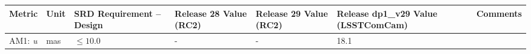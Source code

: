 \documentclass[DM,toc,lsstdraft]{lsstdoc}
\begin{document}
\begin{longtable}[]{@{}lllllll@{}}
  \toprule
  \begin{minipage}[b]{0.12\columnwidth}\raggedright\strut
  Metric\strut
  \end{minipage} & \begin{minipage}[b]{0.06\columnwidth}\raggedright\strut
  Unit\strut
  \end{minipage} & \begin{minipage}[b]{0.14\columnwidth}\raggedright\strut
  SRD Requirement -- Design\strut
  \end{minipage} & \begin{minipage}[b]{0.12\columnwidth}\raggedright\strut
  Release 28 Value (RC2) \strut
  \end{minipage} & \begin{minipage}[b]{0.12\columnwidth}\raggedright\strut
  Release 29 Value (RC2) \strut
  \end{minipage} & \begin{minipage}[b]{0.12\columnwidth}\raggedright\strut
  Release dp1\_v29 Value (LSSTComCam) \strut
  \end{minipage} & \begin{minipage}[b]{0.17\columnwidth}\raggedright\strut
  Comments\strut
  \end{minipage}\tabularnewline
  \midrule
  \endhead
  \begin{minipage}[t]{0.12\columnwidth}\raggedright\strut
  AM1: \emph{u}\strut
  \end{minipage} & \begin{minipage}[t]{0.06\columnwidth}\raggedright\strut
  mas\strut
  \end{minipage} & \begin{minipage}[t]{0.14\columnwidth}\raggedright\strut
  \(\leq 10.0\)\strut
  \end{minipage} & \begin{minipage}[t]{0.12\columnwidth}\raggedright\strut
  - \strut
  \end{minipage} & \begin{minipage}[t]{0.12\columnwidth}\raggedright\strut
  - \strut
  \end{minipage} & \begin{minipage}[t]{0.12\columnwidth}\raggedright\strut
  18.1 \strut
  \end{minipage} & \begin{minipage}[t]{0.17\columnwidth}\raggedright\strut


\end{minipage}
\end{longtable}
\end{document}
